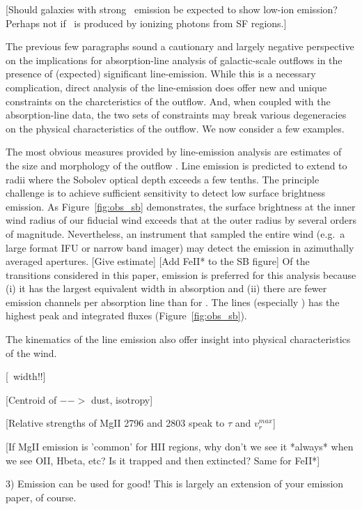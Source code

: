 \documentclass[12pt,preprint]{aastex}
\begin{document}
[Should galaxies with strong \lya\ emission be expected to show
low-ion emission? Perhaps not if \lya\ is produced by ionizing photons
from SF regions.]


The previous few paragraphs sound a cautionary and largely negative
perspective on the implications for absorption-line analysis of
galactic-scale outflows in the presence of (expected) significant
line-emission.   While this is a necessary complication, direct analysis of
the line-emission does offer new and unique
constraints on the charcteristics of the outflow.  And, when coupled
with the absorption-line data, the two sets of constraints may break
various degeneracies on the physical characteristics of the outflow.
We now consider a few examples.

The most obvious measures provided by line-emission analysis are
estimates
of the size and morphology of the outflow \citep{rubin+10c}.  
Line emission is predicted to extend to radii where the Sobolev
optical depth exceeds a few tenths.  The principle
challenge is to achieve sufficient sensitivity to detect low
surface brightness emission. As Figure~\ref{fig:obs_sb}
demonstrates, the surface brightness at the inner wind radius of our
fiducial wind exceeds that at the outer radius by several orders of magnitude.
Nevertheless, an instrument that sampled the entire wind (e.g.\ a
large format IFU or narrow band imager) may detect the emission in
azimuthally averaged apertures. [Give estimate]
[Add FeII* to the SB figure]
Of the transitions considered in this paper,  emission is
preferred for this analysis because 
(i) it has the largest equivalent width in absorption and
(ii) there are fewer emission channels per absorption line than for
.  The  lines (especially \mgiia) has the
highest peak and integrated fluxes 
(Figure~\ref{fig:obs_sb}).  

The kinematics of the line emission also offer insight into physical
characteristics of the wind.

[\feiis\ width!!]

[Centroid of  $-->$ dust, isotropy]

[Relative strengths of MgII 2796 and 2803 speak to $\tau$ and
$v_r^{max}$]

[If MgII emission is 'common' for HII regions,
why don't we see it *always* when we see OII, Hbeta, etc? Is it
trapped and then extincted? Same for FeII*]



3)  Emission can be used for good!   This is largely an extension of
your emission paper, of course.
\end{document}
